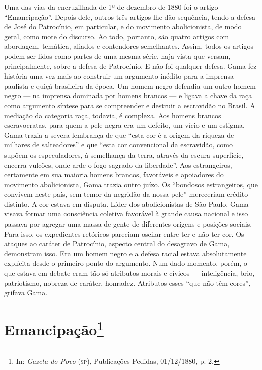 {\footnotesize\noindent
Uma das vias da encruzilhada de 1º de dezembro de 1880 foi o
artigo ``Emancipação''. Depois dele, outros três artigos lhe dão
sequência, tendo a defesa de José do Patrocínio, em particular, e do
movimento abolicionista, de modo geral, como mote do discurso. Ao todo,
portanto, são quatro artigos com abordagem, temática, aliados e
contendores semelhantes. Assim, todos os artigos podem ser lidos como
partes de uma mesma série, haja vista que versam, principalmente, sobre
a defesa de Patrocínio. E não foi qualquer defesa. Gama fez história uma vez
mais ao construir um argumento inédito para a imprensa paulista e quiçá
brasileira da época. Um homem negro defendia um outro homem negro --- na
imprensa dominada por homens brancos --- e ligava a chave da raça como
argumento síntese para se compreender e destruir a escravidão no Brasil.
A mediação da categoria raça, todavia, é complexa. Aos homens brancos
escravocratas, para quem a pele negra era um defeito, um vício e um
estigma, Gama trazia a severa lembrança de que ``esta cor é a origem da
riqueza de milhares de salteadores'' e que ``esta cor convencional da
escravidão, como supõem os especuladores, à semelhança da terra, através
da escura superfície, encerra vulcões, onde arde o fogo sagrado da
liberdade''. Aos estrangeiros, certamente em sua maioria homens brancos,
favoráveis e apoiadores do movimento abolicionista, Gama trazia outro
juízo. Os ``bondosos estrangeiros, que convivem neste país, sem temor da
negridão da nossa pele'' mereceriam crédito distinto. A cor estava em
disputa. Líder dos abolicionistas de São Paulo, Gama visava formar uma
consciência coletiva favorável à grande causa nacional e isso passava
por agregar uma massa de gente de diferentes origens e posições sociais.
Para isso, os expedientes retóricos pareciam oscilar entre ter e não ter
cor. Os ataques ao caráter de Patrocínio, aspecto central do desagravo
de Gama, demonstram isso. Era um homem negro e a defesa racial estava
absolutamente explícita desde o primeiro ponto do argumento. Num dado
momento, porém, o que estava em debate eram tão só atributos morais e
cívicos --- inteligência, brio, patriotismo, nobreza de caráter,
honradez. Atributos esses ``que não têm cores'', grifava Gama.}
\@openrighttrue\makeatother\endgroup


\chapter{Emancipação\footnote[*]{In: \emph{Gazeta do Povo}
  (\textsc{sp}), Publicações Pedidas, 01/12/1880, p. 2.}}

